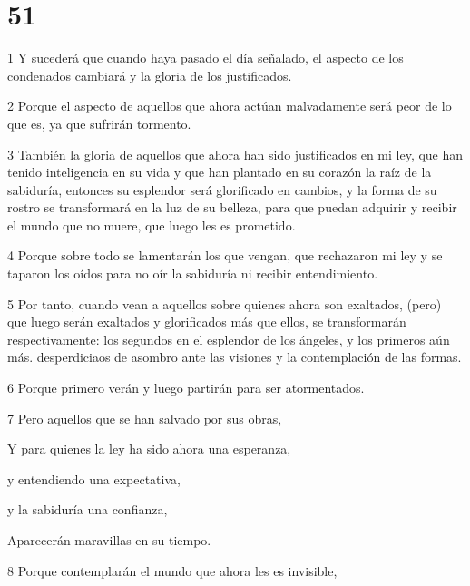 \chapter{51}

\par 1 Y sucederá que cuando haya pasado el día señalado, el aspecto de los condenados cambiará y la gloria de los justificados.

\par 2 Porque el aspecto de aquellos que ahora actúan malvadamente será peor de lo que es, ya que sufrirán tormento.

\par 3 También la gloria de aquellos que ahora han sido justificados en mi ley, que han tenido inteligencia en su vida y que han plantado en su corazón la raíz de la sabiduría, entonces su esplendor será glorificado en cambios, y la forma de su rostro se transformará en la luz de su belleza, para que puedan adquirir y recibir el mundo que no muere, que luego les es prometido.

\par 4 Porque sobre todo se lamentarán los que vengan, que rechazaron mi ley y se taparon los oídos para no oír la sabiduría ni recibir entendimiento.

\par 5 Por tanto, cuando vean a aquellos sobre quienes ahora son exaltados, (pero) que luego serán exaltados y glorificados más que ellos, se transformarán respectivamente: los segundos en el esplendor de los ángeles, y los primeros aún más. desperdiciaos de asombro ante las visiones y la contemplación de las formas.

\par 6 Porque primero verán y luego partirán para ser atormentados.

\par 7 Pero aquellos que se han salvado por sus obras,

\par Y para quienes la ley ha sido ahora una esperanza,

\par y entendiendo una expectativa,

\par y la sabiduría una confianza,

\par Aparecerán maravillas en su tiempo.

\par 8 Porque contemplarán el mundo que ahora les es invisible,

